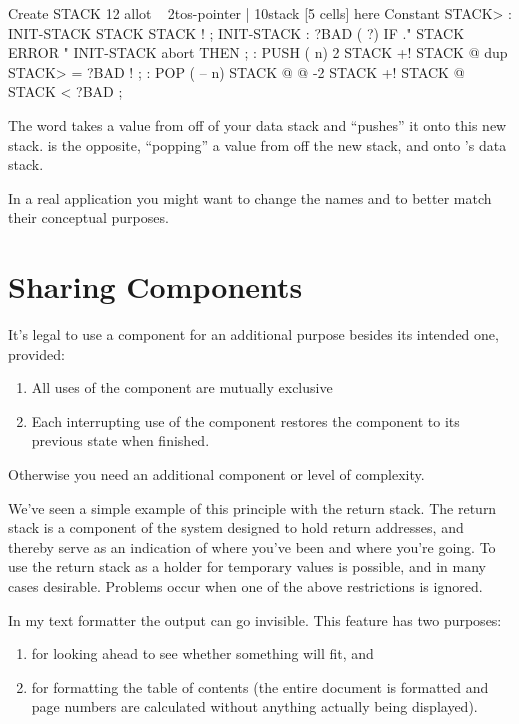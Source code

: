 \begin{Code}
Create STACK  12 allot  \  { 2tos-pointer | 10stack [5 cells] }
here Constant STACK>
: INIT-STACK   STACK STACK ! ;   INIT-STACK
: ?BAD  ( ?)   IF ." STACK ERROR "  INIT-STACK  abort  THEN ;
: PUSH  ( n)   2 STACK +!  STACK @  dup  STACK> = ?BAD  ! ;
: POP  ( -- n)  STACK @ @  -2 STACK +!  STACK @ STACK < ?BAD ;
\end{Code}
The word  takes a value from off of your data stack and
``pushes'' it onto this new stack.  is the opposite,
``popping'' a value from off the new stack, and onto \Forth{}'s data
stack.

In a real application you might want to change the names 
and  to better match their conceptual purposes.

\section{Sharing Components}%
%
\begin{tip}
It's legal to use a component for an additional purpose besides its
intended one, provided:
\medskip
\begin{enumerate}
\item All uses of the component are mutually exclusive
\item Each interrupting use of the component restores the component to
   its previous state when finished.
\end{enumerate}
\medskip\noindent
Otherwise you need an additional component or level of complexity.
\end{tip}%
We've seen a simple example of this principle with the return stack. The
return stack is a component of the \Forth{} system designed to hold return
addresses, and thereby serve as an indication of where you've been and
where you're going. To use the return stack as a holder for temporary
values is possible, and in many cases desirable. Problems occur when one
of the above restrictions is ignored.%

In my text formatter the output can go invisible. This feature has
two purposes: 
\begin{enumerate}
\item for looking ahead to see whether something will fit, and
\item for formatting the table of contents (the entire document is
formatted and page numbers are calculated without anything actually being
displayed).
\end{enumerate}

